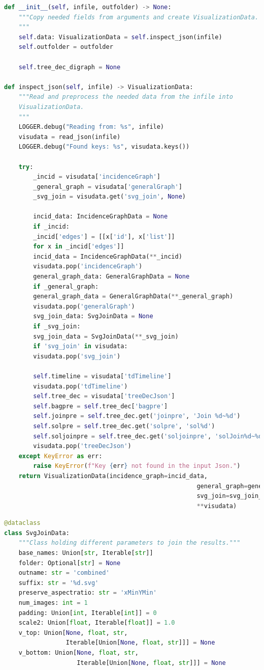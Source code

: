 \documentclass[a4paper, 12pt, bibliography=totoc]{scrartcl}
\begin{document}
\begin{lstlisting}[language={Python}, caption={Initializing a Visualization object}, label={lst:visuinit}]
def __init__(self, infile, outfolder) -> None:
	"""Copy needed fields from arguments and create VisualizationData.
	"""
	self.data: VisualizationData = self.inspect_json(infile)
	self.outfolder = outfolder
	
	self.tree_dec_digraph = None
	
def inspect_json(self, infile) -> VisualizationData:
	"""Read and preprocess the needed data from the infile into 
	VisualizationData.
	"""
	LOGGER.debug("Reading from: %s", infile)
	visudata = read_json(infile)
	LOGGER.debug("Found keys: %s", visudata.keys())
	
	try:
		_incid = visudata['incidenceGraph']
		_general_graph = visudata['generalGraph']
		_svg_join = visudata.get('svg_join', None)
		
		incid_data: IncidenceGraphData = None
		if _incid:
		_incid['edges'] = [[x['id'], x['list']]
		for x in _incid['edges']]
		incid_data = IncidenceGraphData(**_incid)
		visudata.pop('incidenceGraph')
		general_graph_data: GeneralGraphData = None
		if _general_graph:
		general_graph_data = GeneralGraphData(**_general_graph)
		visudata.pop('generalGraph')
		svg_join_data: SvgJoinData = None
		if _svg_join:
		svg_join_data = SvgJoinData(**_svg_join)
		if 'svg_join' in visudata:
		visudata.pop('svg_join')
		
		self.timeline = visudata['tdTimeline']
		visudata.pop('tdTimeline')
		self.tree_dec = visudata['treeDecJson']
		self.bagpre = self.tree_dec['bagpre']
		self.joinpre = self.tree_dec.get('joinpre', 'Join %d~%d')
		self.solpre = self.tree_dec.get('solpre', 'sol%d')
		self.soljoinpre = self.tree_dec.get('soljoinpre', 'solJoin%d~%d')
		visudata.pop('treeDecJson')
	except KeyError as err:
		raise KeyError(f"Key {err} not found in the input Json.")
	return VisualizationData(incidence_graph=incid_data,
													 general_graph=general_graph_data,
													 svg_join=svg_join_data,
													 **visudata)

\end{lstlisting}

\begin{lstlisting}[language={Python}, caption={SvgJoinData}, label={lst:svgjoindata}]
@dataclass
class SvgJoinData:
	"""Class holding different parameters to join the results."""
	base_names: Union[str, Iterable[str]]
	folder: Optional[str] = None
	outname: str = 'combined'
	suffix: str = '%d.svg'
	preserve_aspectratio: str = 'xMinYMin'
	num_images: int = 1
	padding: Union[int, Iterable[int]] = 0
	scale2: Union[float, Iterable[float]] = 1.0
	v_top: Union[None, float, str, 
	             Iterable[Union[None, float, str]]] = None
	v_bottom: Union[None, float, str, 
	                Iterable[Union[None, float, str]]] = None	
\end{lstlisting}
\end{document}
